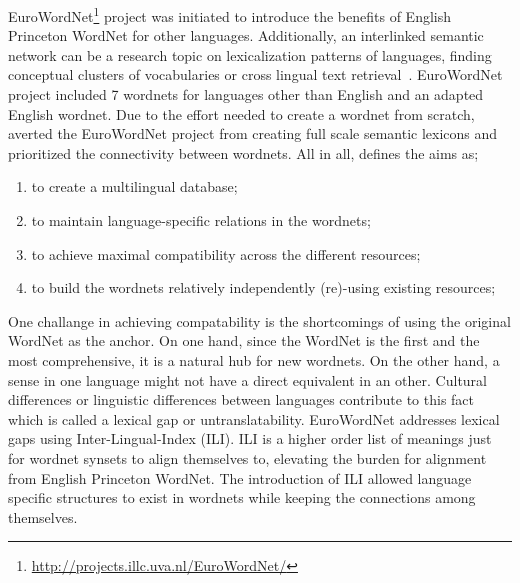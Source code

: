 EuroWordNet\footnote{\url{http://projects.illc.uva.nl/EuroWordNet/}} project was initiated to introduce the benefits of English Princeton WordNet for other languages.
Additionally, an interlinked semantic network can be a research topic on lexicalization patterns of languages, finding conceptual clusters of vocabularies or cross lingual text retrieval~\cite{gonzalo_applying_1998, vossen_introduction_1998}.
EuroWordNet project included 7 wordnets for languages other than English and an adapted English wordnet.
Due to the effort needed to create a wordnet from scratch, \citeauthor{vossen_introduction_1998} averted the EuroWordNet project from creating full scale semantic lexicons and prioritized the connectivity between wordnets.
All in all, \textcite{vossen_introduction_1998} defines the aims as;
\begin{displayquote}
    \begin{enumerate}
        \item to create a multilingual database;
        \item to maintain language-specific relations in the wordnets;
        \item to achieve maximal compatibility across the different resources;
        \item to build the wordnets relatively independently (re)-using existing resources;
    \end{enumerate}
\end{displayquote}

One challange in achieving compatability is the shortcomings of using the original WordNet as the anchor.
On one hand, since the WordNet is the first and the most comprehensive, it is a natural hub for new wordnets.
On the other hand, a sense in one language might not have a direct equivalent in an other.
Cultural differences or linguistic differences between languages contribute to this fact~\cite{kitamura_cultural_2009} which is called a lexical gap or untranslatability.
EuroWordNet addresses lexical gaps using Inter-Lingual-Index (ILI).
ILI is a higher order list of meanings just for wordnet synsets to align themselves to, elevating the burden for alignment from English Princeton WordNet.
The introduction of ILI allowed language specific structures to exist in wordnets while keeping the connections among themselves.

